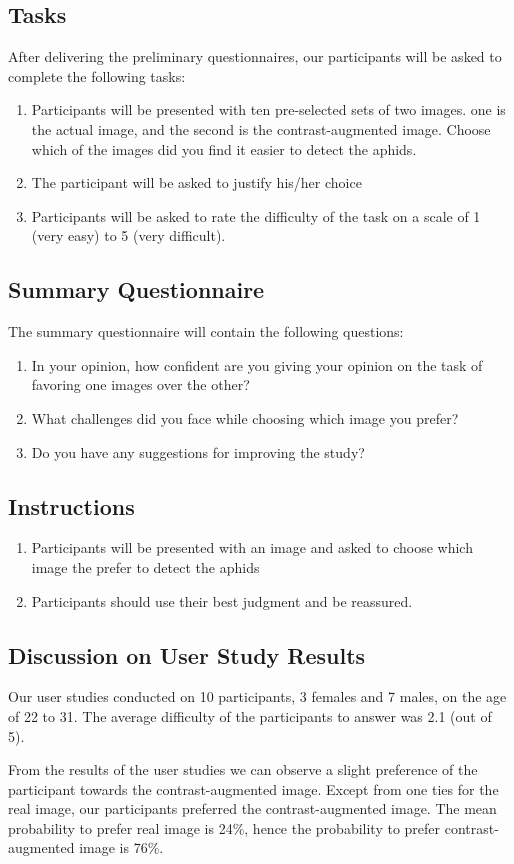 \documentclass{article}
\begin{document}
\subsection{Tasks}
After delivering the preliminary questionnaires, our participants will be asked to complete the following tasks:

\begin{enumerate}
    \item Participants will be presented with ten pre-selected sets of two images. one is the actual image, and the second is the contrast-augmented image.
    Choose which of the images did you find it easier to detect the aphids.
    \item The participant will be asked to justify his/her choice
    \item Participants will be asked to rate the difficulty of the task on a scale of 1 (very easy) to 5 (very difficult).
\end{enumerate}

\subsection{Summary Questionnaire}
The summary questionnaire will contain the following questions: 

\begin{enumerate}
    \item In your opinion, how confident are you giving your opinion on the task of favoring one
    images over the other?    
    \item What challenges did you face while choosing which image you prefer?
    \item Do you have any suggestions for improving the study?
\end{enumerate}

\subsection{Instructions}
\begin{enumerate}
    \item Participants will be presented with an image and asked to choose which image the prefer to detect the aphids
    \item Participants should use their best judgment and be reassured.
\end{enumerate}

\subsection{Discussion on User Study Results}
Our user studies conducted on 10 participants, 3 females and 7 males, on the age of 22 to 31.
The average difficulty of the participants to answer was 2.1 (out of 5).

From the results of the user studies we can observe a slight preference of the participant
towards the contrast-augmented image. Except from one ties for the real image, our participants
preferred the contrast-augmented image. The mean probability to prefer real image is
24\%, hence the probability to prefer contrast-augmented image is 76\%.
\end{document}
